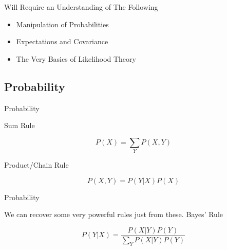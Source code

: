 \documentclass[12pt,ignorenonframetext,]{beamer}
\begin{document}
\begin{frame}{Will Require an Understanding of The Following}
\protect\hypertarget{will-require-an-understanding-of-the-following}{}

\begin{itemize}
\item
  Manipulation of Probabilities
\item
  Expectations and Covariance
\item
  The Very Basics of Likelihood Theory
\end{itemize}

\end{frame}

\hypertarget{probability}{%
\subsection{Probability}\label{probability}}

\begin{frame}{Probability}
\protect\hypertarget{probability-1}{}

Sum Rule

\[P(X) = \sum_Y P(X,Y)\]

Product/Chain Rule

\[P(X,Y) = P(Y|X)P(X)\]

\end{frame}

\begin{frame}{Probability}
\protect\hypertarget{probability-2}{}

We can recover some very powerful rules just from these. \newline Bayes'
Rule

\[P(Y|X) = \dfrac{P(X|Y)P(Y)}{\displaystyle{\sum_Y} P(X|Y)P(Y) }\]

\end{frame}
\end{document}
